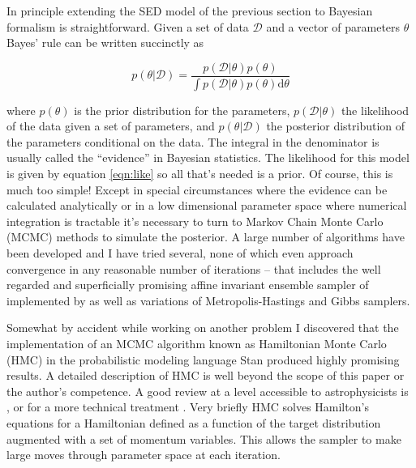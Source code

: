 \documentclass[modern]{aastex62}
\begin{document}
In principle extending the SED model of the previous section to Bayesian formalism is straightforward. Given a set of data $\mathcal{D}$ and a vector of parameters $\theta$ Bayes' rule can be written succinctly as \citep{bda3} 

\begin{equation}
\label{eqn:bayesrule}
p(\theta | \mathcal{D}) =  \frac{p(\mathcal{D} | \theta) p(\theta)}{\int p(\mathcal{D} | \theta) p(\theta) \mathrm{d} \theta}
\end{equation}

where $p(\theta)$ is the prior distribution for the parameters, $p(\mathcal{D} | \theta)$ the likelihood of the data given a set of parameters, and $p(\theta | \mathcal{D})$ the posterior distribution of the parameters conditional on the data. The integral in the denominator is usually called the ``evidence'' in Bayesian statistics. The likelihood for this model is given by equation \ref{eqn:like} so all that's needed is a prior. Of course, this is much too simple! Except in special circumstances where the evidence can be calculated analytically or in a low dimensional parameter space where numerical integration is tractable it's necessary to turn to Markov Chain Monte Carlo (MCMC) methods \citep{mcsm} to simulate the posterior. A large number of algorithms have been developed and I have tried several, none of which even approach convergence in any reasonable number of iterations -- that includes the well regarded and superficially promising affine invariant ensemble sampler of \citet{2010gw} implemented by \citet{2013PASP..125..306F} as well as variations of Metropolis-Hastings and Gibbs samplers.

Somewhat by accident while working on another problem I discovered that the implementation of an MCMC algorithm known as Hamiltonian Monte Carlo (HMC) in the probabilistic modeling language Stan \citep{stanlang} produced highly promising results. A detailed description of HMC is well beyond the scope of this paper or the author's competence. A good review at a level accessible to astrophysicists is \citet{2017arXiv170102434B}, or for a more technical treatment \citet{2017arXiv170502891B}. Very briefly HMC solves Hamilton's equations for a Hamiltonian defined as a function of the target distribution augmented with a set of momentum variables. This allows the sampler to make large moves through parameter space at each iteration.
\end{document}
